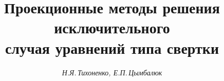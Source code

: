 

 




 


\newcommand{\im}{\operatorname{Im}} 




\newcommand{\ctg}{\operatorname{ctg}} 


\newcommand{\ind}{\operatorname{ind}} 


\newcommand{\tts}[1]{} 


 


\renewcommand{\baselinestretch}{1.06}


 




  


\setcounter{page}{62} 












\author{\it Н.Я.\,Тихоненко, Е.П.\,Цымбалюк} 




\title{Проекционные методы решения исключительного\\ 


случая уравнений типа свертки} 


 


\date{} 




